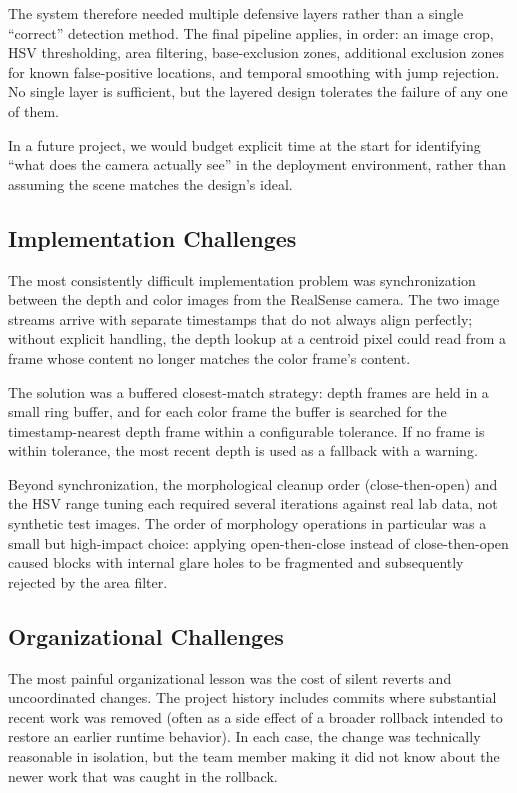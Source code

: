 \documentclass[conference]{IEEEtran}
\begin{document}
The system therefore needed multiple defensive layers rather than a
single ``correct'' detection method. The final pipeline applies, in
order: an image crop, HSV thresholding, area filtering, base-exclusion
zones, additional exclusion zones for known false-positive locations,
and temporal smoothing with jump rejection. No single layer is
sufficient, but the layered design tolerates the failure of any one
of them.

In a future project, we would budget explicit time at the start for
identifying ``what does the camera actually see'' in the deployment
environment, rather than assuming the scene matches the design's
ideal.

\subsection{Implementation Challenges}

The most consistently difficult implementation problem was
synchronization between the depth and color images from the RealSense
camera. The two image streams arrive with separate timestamps that do
not always align perfectly; without explicit handling, the depth
lookup at a centroid pixel could read from a frame whose content no
longer matches the color frame's content.

The solution was a buffered closest-match strategy: depth frames are
held in a small ring buffer, and for each color frame the buffer is
searched for the timestamp-nearest depth frame within a configurable
tolerance. If no frame is within tolerance, the most recent depth is
used as a fallback with a warning.

Beyond synchronization, the morphological cleanup order
(close-then-open) and the HSV range tuning each required several
iterations against real lab data, not synthetic test images. The order
of morphology operations in particular was a small but high-impact
choice: applying open-then-close instead of close-then-open caused
blocks with internal glare holes to be fragmented and subsequently
rejected by the area filter.

\subsection{Organizational Challenges}

The most painful organizational lesson was the cost of silent reverts
and uncoordinated changes. The project history includes commits where
substantial recent work was removed (often as a side effect of a
broader rollback intended to restore an earlier runtime behavior). In
each case, the change was technically reasonable in isolation, but the
team member making it did not know about the newer work that was
caught in the rollback.
\end{document}
